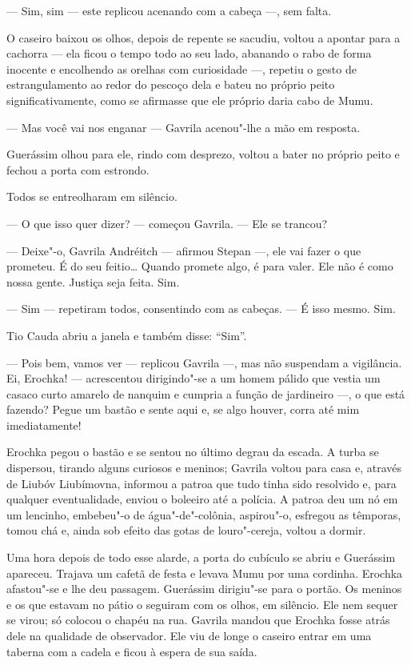 --- Sim, sim --- este replicou acenando com a cabeça ---, sem falta.

O caseiro baixou os olhos, depois de repente se sacudiu, voltou a
apontar para a cachorra --- ela ficou o tempo todo ao seu lado, abanando o rabo
de forma inocente e encolhendo as orelhas com curiosidade ---, repetiu o
gesto de estrangulamento ao redor do pescoço dela e bateu no próprio
peito significativamente, como se afirmasse que ele próprio daria cabo
de Mumu.

--- Mas você vai nos enganar --- Gavrila acenou"-lhe a mão em resposta.

Guerássim olhou para ele, rindo com desprezo, voltou a bater no próprio
peito e fechou a porta com estrondo.

Todos se entreolharam em silêncio.

--- O que isso quer dizer? --- começou Gavrila. --- Ele se trancou?

--- Deixe"-o, Gavrila Andréitch --- afirmou Stepan ---, ele vai fazer o
que prometeu. É do seu feitio\ldots{} Quando promete algo, é para valer. Ele
não é como nossa gente. Justiça seja feita. Sim.

--- Sim --- repetiram todos, consentindo com as cabeças. --- É isso
mesmo. Sim.

Tio Cauda abriu a janela e também disse: ``Sim''.

--- Pois bem, vamos ver --- replicou Gavrila ---, mas não suspendam a
vigilância. Ei, Erochka! --- acrescentou dirigindo"-se a um homem pálido que vestia um casaco curto amarelo de nanquim e cumpria a função de
jardineiro ---, o que está fazendo? Pegue um bastão e sente aqui e, se
algo houver, corra até mim imediatamente!

Erochka pegou o bastão e se sentou no último degrau da escada. A turba
se dispersou, tirando alguns curiosos e meninos; Gavrila voltou para
casa e, através de Liubóv Liubímovna, informou a patroa que tudo tinha
sido resolvido e, para qualquer eventualidade, enviou o boleeiro até a
polícia. A patroa deu um nó em um lencinho, embebeu"-o de
água"-de"-colônia, aspirou"-o, esfregou as têmporas, tomou chá e, ainda sob
efeito das gotas de louro"-cereja, voltou a dormir.

Uma hora depois de todo esse alarde, a porta do cubículo se abriu e
Guerássim apareceu. Trajava um cafetã de festa e levava Mumu por uma
cordinha. Erochka afastou"-se e lhe deu passagem. Guerássim dirigiu"-se
para o portão. Os meninos e os que estavam no pátio o seguiram com os
olhos, em silêncio. Ele nem sequer se virou; só colocou o chapéu na rua.
Gavrila mandou que Erochka fosse atrás dele na qualidade de observador.
Ele viu de longe o caseiro entrar em uma taberna com a cadela e ficou à
espera de sua saída.

